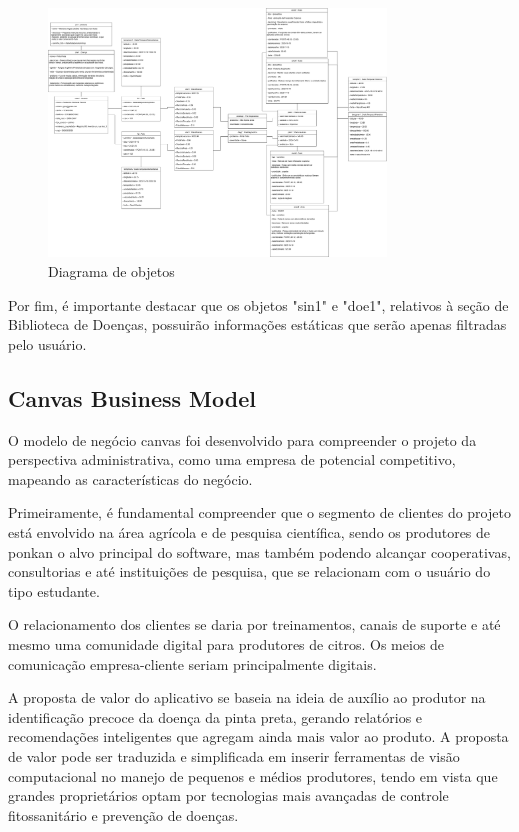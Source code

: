 \documentclass[
  a4paper,%
  12pt,%
  english,%
  brazilian,%
]{article}
\begin{document}
        \begin{figure}[h]
\centering
\caption{Diagrama de objetos}%
\label{fig:diagrama-objetos}
 \includegraphics[width=0.8\textwidth]{Logos/objetos_blackspot.png}
\end{figure}

Por fim, é importante destacar que os objetos "sin1" e "doe1", relativos à seção de Biblioteca de Doenças, possuirão informações estáticas que serão apenas filtradas pelo usuário.

\subsection*{Canvas Business Model}

    O modelo de negócio canvas foi desenvolvido para compreender o projeto da perspectiva administrativa, como uma empresa de potencial competitivo, mapeando as características do negócio.

    Primeiramente, é fundamental compreender que o segmento de clientes do projeto está envolvido na área agrícola e de pesquisa científica, sendo os produtores de ponkan o alvo principal do software, mas também podendo alcançar cooperativas, consultorias e até instituições de pesquisa, que se relacionam com o usuário do tipo estudante.

    O relacionamento dos clientes se daria por treinamentos, canais de suporte e até mesmo uma comunidade digital para produtores de citros. Os meios de comunicação empresa-cliente seriam principalmente digitais. 

    A proposta de valor do aplicativo se baseia na ideia de auxílio ao produtor na identificação precoce da doença da pinta preta, gerando relatórios e recomendações inteligentes que agregam ainda mais valor ao produto. A proposta de valor pode ser traduzida e simplificada em inserir ferramentas de visão computacional no manejo de pequenos e médios produtores, tendo em vista que grandes proprietários optam por tecnologias mais avançadas de controle fitossanitário e prevenção de doenças.
\end{document}

